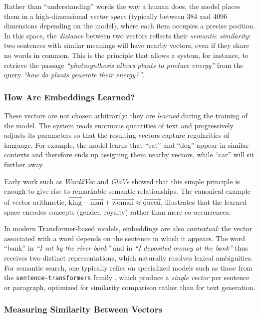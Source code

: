 \documentclass[a4paper,11pt]{article}
\begin{document}
Rather than ``understanding'' words the way a human does, the model places
them in a high-dimensional \emph{vector space} (typically between 384 and
4096 dimensions depending on the model), where each item occupies a precise
position. In this space, the \emph{distance} between two vectors reflects
their \emph{semantic similarity}: two sentences with similar meanings will
have nearby vectors, even if they share no words in common. This is the
principle that allows a system, for instance, to retrieve the passage
\textit{``photosynthesis allows plants to produce energy''} from the query
\textit{``how do plants generate their energy?''}.

\subsubsection{How Are Embeddings Learned?}

These vectors are not chosen arbitrarily: they are \emph{learned} during
the training of the model. The system reads enormous quantities of text and
progressively adjusts its parameters so that the resulting vectors capture
regularities of language. For example, the model learns that ``cat'' and
``dog'' appear in similar contexts and therefore ends up assigning them
nearby vectors, while ``car'' will sit further away.

Early work such as \emph{Word2Vec} \cite{mikolov2013word2vec} and
\emph{GloVe} \cite{pennington2014glove} showed that this simple principle
is enough to give rise to remarkable semantic relationships. The
canonical example of vector arithmetic,
$\overrightarrow{\text{king}} - \overrightarrow{\text{man}}
+ \overrightarrow{\text{woman}} \approx \overrightarrow{\text{queen}}$,
illustrates that the learned space encodes concepts (gender, royalty)
rather than mere co-occurrences.

In modern Transformer-based models, embeddings are also \emph{contextual}:
the vector associated with a word depends on the sentence in which it
appears. The word ``bank'' in \textit{``I sat by the river bank''} and in
\textit{``I deposited money at the bank''} thus receives two distinct
representations, which naturally resolves lexical ambiguities. For semantic
search, one typically relies on specialized models such as those from the
\texttt{sentence-transformers} family \cite{reimers2019sbert}, which
produce a \emph{single vector} per sentence or paragraph, optimized for
similarity comparison rather than for text generation.

\subsubsection{Measuring Similarity Between Vectors}
\end{document}
